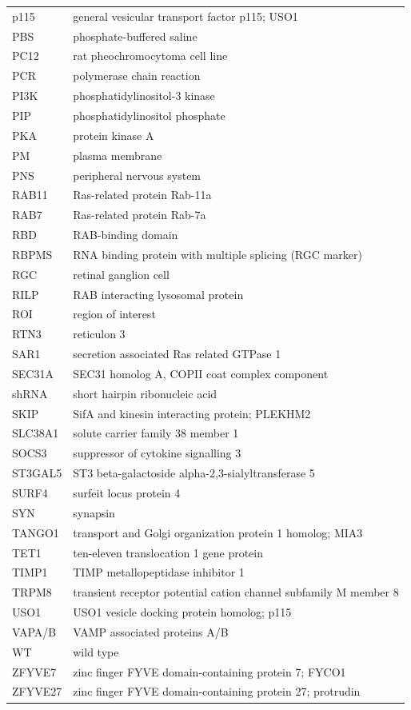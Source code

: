 \documentclass[
  12pt,
  a4paper,
]{book}
\begin{document}
\begin{longtable}[]{@{}
  >{\raggedright\arraybackslash}p{}
  >{\raggedright\arraybackslash}p{}@{}}
p115 & general vesicular transport factor p115; USO1 \\
PBS & phosphate-buffered saline \\
PC12 & rat pheochromocytoma cell line \\
PCR & polymerase chain reaction \\
PI3K & phosphatidylinositol-3 kinase \\
PIP & phosphatidylinositol phosphate \\
PKA & protein kinase A \\
PM & plasma membrane \\
PNS & peripheral nervous system \\
RAB11 & Ras-related protein Rab-11a \\
RAB7 & Ras-related protein Rab-7a \\
RBD & RAB-binding domain \\
RBPMS & RNA binding protein with multiple splicing (RGC marker) \\
RGC & retinal ganglion cell \\
RILP & RAB interacting lysosomal protein \\
ROI & region of interest \\
RTN3 & reticulon 3 \\
SAR1 & secretion associated Ras related GTPase 1 \\
SEC31A & SEC31 homolog A, COPII coat complex component \\
shRNA & short hairpin ribonucleic acid \\
SKIP & SifA and kinesin interacting protein; PLEKHM2 \\
SLC38A1 & solute carrier family 38 member 1 \\
SOCS3 & suppressor of cytokine signalling 3 \\
ST3GAL5 & ST3 beta-galactoside alpha-2,3-sialyltransferase 5 \\
SURF4 & surfeit locus protein 4 \\
SYN & synapsin \\
TANGO1 & transport and Golgi organization protein 1 homolog; MIA3 \\
TET1 & ten-eleven translocation 1 gene protein \\
TIMP1 & TIMP metallopeptidase inhibitor 1 \\
TRPM8 & transient receptor potential cation channel subfamily M member 8 \\
USO1 & USO1 vesicle docking protein homolog; p115 \\
VAPA/B & VAMP associated proteins A/B \\
WT & wild type \\
ZFYVE7 & zinc finger FYVE domain-containing protein 7; FYCO1 \\
ZFYVE27 & zinc finger FYVE domain-containing protein 27; protrudin \\
\bottomrule()
\end{longtable}
\end{document}
